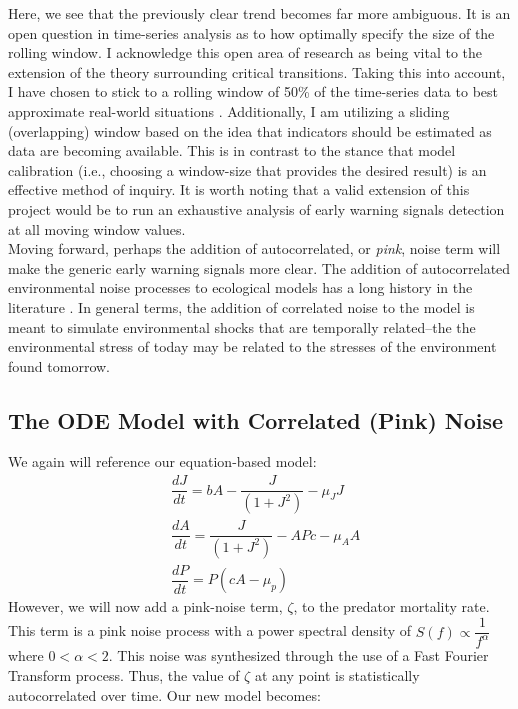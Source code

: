 \documentclass[12pt]{article}
\begin{document}
Here, we see that the previously clear trend becomes far more ambiguous. It is an open question in time-series analysis as to how optimally specify the size of the rolling window. I acknowledge this open area of research as being vital to the extension of the theory surrounding critical transitions. Taking this into account, I have chosen to stick to a rolling window of 50\% of the time-series data to best approximate real-world situations \cite{Scheffer2001}. Additionally, I am utilizing a sliding (overlapping) window based on the idea that indicators should be estimated as data are becoming available. This is in contrast to the stance that model calibration (i.e., choosing a window-size that provides the desired result) is an effective method of inquiry. It is worth noting that a valid extension of this project would be to run an exhaustive analysis of early warning signals detection at all moving window values.\\

Moving forward, perhaps the addition of autocorrelated, or \emph{pink}, noise term will make the generic early warning signals more clear. The addition of autocorrelated environmental noise processes to ecological models has a long history in the literature \cite{Vasseur2014}\cite{Halley1996}\cite{Ghosh2012}\cite{Cohen1998}\cite{Ruokolainen2009}. In general terms, the addition of correlated noise to the model is meant to simulate environmental shocks that are temporally related--the the environmental stress of today may be related to the stresses of the environment found tomorrow.

\subsection{The ODE Model with Correlated (Pink) Noise}


We again will reference our equation-based model:
\begin{align}
	& \dfrac{dJ}{dt} = bA - \dfrac{J}{(1+J^2)} - \mu_JJ\\
	& \dfrac{dA}{dt} = \dfrac{J}{(1+J^2)} - APc - \mu_AA\\
	& \dfrac{dP}{dt} = P(cA - \mu_p)
\end{align}
However, we will now add a pink-noise term, $\zeta$, to the predator mortality rate. This term is a pink noise process with a power spectral density of $S(f) \propto \dfrac{1}{f^{\alpha}}$ where $0<\alpha<2$. This noise was synthesized through the use of a Fast Fourier Transform process.  Thus, the value of $\zeta$ at any point is statistically autocorrelated over time. Our new model becomes:
\end{document}
